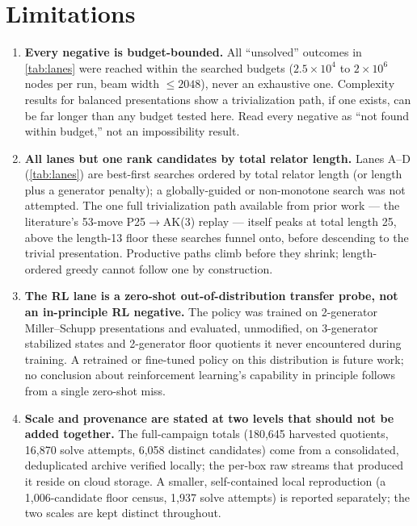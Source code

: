 \section{Limitations}\label{sec:limitations}

\begin{enumerate}
  \item \textbf{Every negative is budget-bounded.} All ``unsolved'' outcomes in
    \ref{tab:lanes} were reached within the searched budgets ($2.5\times10^4$ to $2\times10^6$
    nodes per run, beam width $\leq 2048$), never an exhaustive one. Complexity results
    for balanced presentations \cite{bridson2015complexity, lishak2017balanced} show a
    trivialization path, if one exists, can be far longer than any budget tested here. Read
    every negative as ``not found within budget,'' not an impossibility result.

  \item \textbf{All lanes but one rank candidates by total relator length.} Lanes A--D
    (\ref{tab:lanes}) are best-first searches ordered by total relator length (or length
    plus a generator penalty); a globally-guided or non-monotone search was not attempted.
    The one full trivialization path available from prior work --- the literature's 53-move
    P25$\to$AK(3) replay --- itself peaks at total length 25, above the length-13 floor these
    searches funnel onto, before descending to the trivial presentation. Productive paths
    climb before they shrink; length-ordered greedy cannot follow one by construction.

  \item \textbf{The RL lane is a zero-shot out-of-distribution transfer probe, not an
    in-principle RL negative.} The policy was trained on 2-generator Miller--Schupp
    presentations and evaluated, unmodified, on 3-generator stabilized states and
    2-generator floor quotients it never encountered during training. A retrained or
    fine-tuned policy on this distribution is future work; no conclusion about
    reinforcement learning's capability in principle follows from a single zero-shot miss.

  \item \textbf{Scale and provenance are stated at two levels that should not be added
    together.} The full-campaign totals (180,645 harvested quotients, 16,870 solve
    attempts, 6,058 distinct candidates) come from a consolidated, deduplicated archive
    verified locally; the per-box raw streams that produced it reside on cloud storage. A
    smaller, self-contained local reproduction (a 1,006-candidate floor census, 1,937 solve
    attempts) is reported separately; the two scales are kept distinct throughout.


\end{enumerate}
